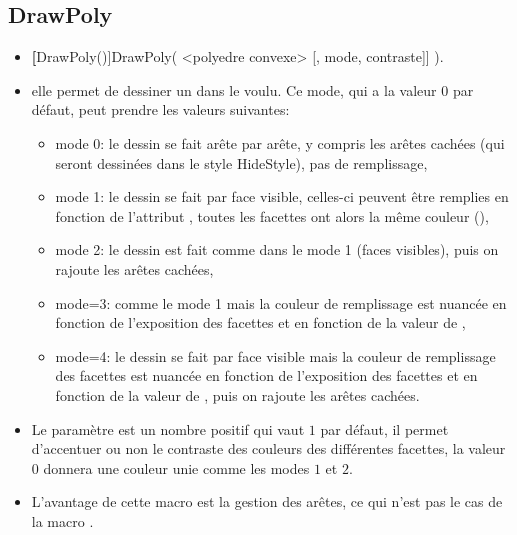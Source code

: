 \subsection{DrawPoly}\label{macDrawPoly}
\begin{itemize}
 \item \util \textbf[DrawPoly()]{DrawPoly( <polyedre convexe> [, mode, contraste]] )}.
 \item \desc elle permet de dessiner un  dans le  voulu. Ce mode, qui a la valeur $0$ par défaut, peut prendre les valeurs suivantes:

\begin{itemize}
 \item mode 0: le dessin se fait arête par arête, y compris les arêtes cachées (qui seront dessinées dans le style HideStyle), pas de remplissage,
 \item mode 1: le dessin se fait par face visible, celles-ci peuvent être remplies en fonction de l'attribut , toutes les facettes ont alors la même couleur (),
 \item mode 2: le dessin est fait comme dans le mode 1 (faces visibles), puis on rajoute les arêtes cachées, \item mode=3: comme le mode 1 mais la couleur de remplissage est nuancée en fonction de l'exposition des facettes et en fonction de la valeur de , 
 \item mode=4: le dessin se fait par face visible mais la couleur de remplissage des facettes est nuancée en fonction de l'exposition des facettes et en fonction de la valeur de , puis on rajoute les arêtes cachées.
\end{itemize}
 \item Le paramètre  est un nombre positif qui vaut $1$ par défaut, il permet d'accentuer ou non le contraste des couleurs des différentes facettes, la valeur $0$ donnera une couleur unie comme les modes $1$ et $2$.
 \item L'avantage de cette macro est la gestion des arêtes, ce qui n'est pas le cas de la macro .
\end{itemize}


